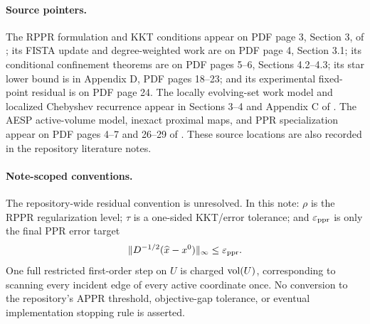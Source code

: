 \paragraph{Source pointers.}
The RPPR formulation and KKT conditions appear on PDF page 3, Section 3, of
\citet{fountoulakis2026}; its FISTA update and degree-weighted work are on PDF
page 4, Section 3.1; its conditional confinement theorems are on PDF pages
5--6, Sections 4.2--4.3; its star lower bound is in Appendix D, PDF pages
18--23; and its experimental fixed-point residual is on PDF page 24.  The
locally evolving-set work model and localized Chebyshev recurrence appear in
Sections 3--4 and Appendix C of \citet{zhou2024}.  The AESP active-volume
model, inexact proximal maps, and PPR specialization appear on PDF pages 4--7
and 26--29 of \citet{huang2025}.  These source locations are also recorded in
the repository literature notes.

\paragraph{Note-scoped conventions.}
The repository-wide residual convention is unresolved.  In this note:
$\rho$ is the RPPR regularization level; $\tau$ is a one-sided KKT/error
tolerance; and $\varepsilon_{\mathrm{ppr}}$ is only the final PPR error target
\begin{equation}
  \lVert D^{-1/2}(\widehat x-x^0)\rVert_\infty\leq\varepsilon_{\mathrm{ppr}}.
  \label{eq:note-error}
\end{equation}
One full restricted first-order step on $U$ is charged $\operatorname{vol}(U)$, corresponding
to scanning every incident edge of every active coordinate once.  No
conversion to the repository's APPR threshold, objective-gap tolerance, or
eventual implementation stopping rule is asserted.
